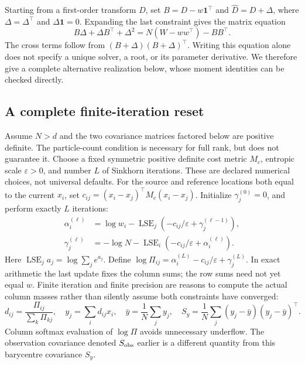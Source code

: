 \documentclass[11pt,a4paper]{article}
\newcommand{\one}{\mathbf 1}
\newcommand{\lse}{\operatorname{LSE}}
\begin{document}
Starting from a first-order transform \(D\), set \(B=D-w\one^\top\) and
\(\widehat D=D+\Delta\), where \(\Delta=\Delta^\top\) and
\(\Delta\one=0\). Expanding the last constraint gives the matrix equation
\begin{equation}
\label{eq:riccati-correction}
 B\Delta+\Delta B^\top+\Delta^2
   =N(W-ww^\top)-BB^\top.
\end{equation}
The cross terms follow from \((B+\Delta)(B+\Delta)^\top\).
Writing this equation alone does not specify a unique solver, a root,
or its parameter derivative. We therefore give a complete alternative
realization below, whose moment identities can be checked directly.

\subsection{A complete finite-iteration reset}

Assume \(N>d\) and the two covariance matrices factored below are positive
definite. The particle-count condition is necessary for full rank, but does
not guarantee it. Choose a fixed symmetric positive definite cost metric
\(M_c\), entropic scale \(\varepsilon>0\), and number \(L\) of Sinkhorn
iterations. These are declared numerical choices, not universal defaults.
For the source and reference locations both equal to the current \(x_i\), set
\(c_{ij}=(x_i-x_j)^\top M_c(x_i-x_j)\).
Initialize \(\gamma_j^{(0)}=0\), and perform exactly \(L\) iterations:
\begin{align}
\label{eq:sinkhorn-iterations}
 \alpha_i^{(\ell)}
  &=\log w_i-\lse_j\!\left(-c_{ij}/\varepsilon+
                                 \gamma_j^{(\ell-1)}\right),\\
 \gamma_j^{(\ell)}
  &=-\log N-\lse_i\!\left(-c_{ij}/\varepsilon+
                                 \alpha_i^{(\ell)}\right).
 \nonumber
\end{align}
Here \(\lse_j a_j=\log\sum_j e^{a_j}\). Define
\(\log\Pi_{ij}=\alpha_i^{(L)}-c_{ij}/\varepsilon+\gamma_j^{(L)}\).
In exact arithmetic the last update fixes the column sums; the row sums
need not yet equal \(w\). Finite iteration and finite precision are reasons
to compute the actual column masses rather than silently assume both
constraints have converged:
\begin{equation}
\label{eq:actual-barycentres}
 d_{ij}=\frac{\Pi_{ij}}{\sum_k\Pi_{kj}},\quad
 y_j=\sum_i d_{ij}x_i,\quad
 \bar y=\frac1N\sum_j y_j,\quad
 S_y=\frac1N\sum_j(y_j-\bar y)(y_j-\bar y)^\top .
\end{equation}
Column softmax evaluation of \(\log\Pi\) avoids unnecessary underflow.
The observation covariance denoted \(S_{\rm obs}\) earlier is a different
quantity from this barycentre covariance \(S_y\).
\end{document}
